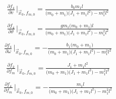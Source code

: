 \documentclass[12pt,a4paper,oneside]{book}
\begin{document}
\begin{onehalfspace}
\begin{equation}
\begin{aligned}
	\end{aligned}
\end{equation}
\begin{equation}\label{pendulum_on_cart_21}
	\begin{aligned}
		\frac{\partial f_4}{\partial v}\,\Big|_{\vec{x}_0,f_{m,0}}=\frac{b_0m_1l}{\big(m_0+m_1\big)\big(J_1+m_1l^2\big)-m_1^2l^2}\\[6pt]
	\end{aligned}
\end{equation}
\begin{equation}\label{pendulum_on_cart_22}
	\begin{aligned}
		\frac{\partial f_4}{\partial \vartheta}\,\Big|_{\vec{x}_0,f_{m,0}}=\frac{gm_1\big(m_0+m_1\big)l}{\big(m_0+m_1\big)\big(J_1+m_1l^2\big)-m_1^2l^2}\\[6pt]
	\end{aligned}
\end{equation}
\begin{equation}\label{pendulum_on_cart_23}
	\begin{aligned}
		\frac{\partial f_4}{\partial \omega}\,\Big|_{\vec{x}_0,f_{m,0}}=-\frac{b_1\big(m_0+m_1\big)}{\big(m_0+m_1\big)\big(J_1+m_1l^2\big)-m_1^2l^2}\\[6pt]
	\end{aligned}
\end{equation}
\begin{equation}\label{pendulum_on_cart_24}
	\begin{aligned}
		\frac{\partial f_2}{\partial f_m}\,\Big|_{\vec{x}_0,f_{m,0}}=\frac{J_1+m_1l^2}{\big(m_0+m_1\big)\big(J_1+m_1l^2\big)-m_1^2l^2}\\[6pt]
	\end{aligned}
\end{equation}
\begin{equation}\label{pendulum_on_cart_25}
	\begin{aligned}
		\frac{\partial f_4}{\partial f_m}\,\Big|_{\vec{x}_0,f_{m,0}}=-\frac{m_1l}{\big(m_0+m_1\big)\big(J_1+m_1l^2\big)-m_1^2l^2}\\[6pt]
	\end{aligned}
\end{equation}


\end{onehalfspace}
\end{document}
